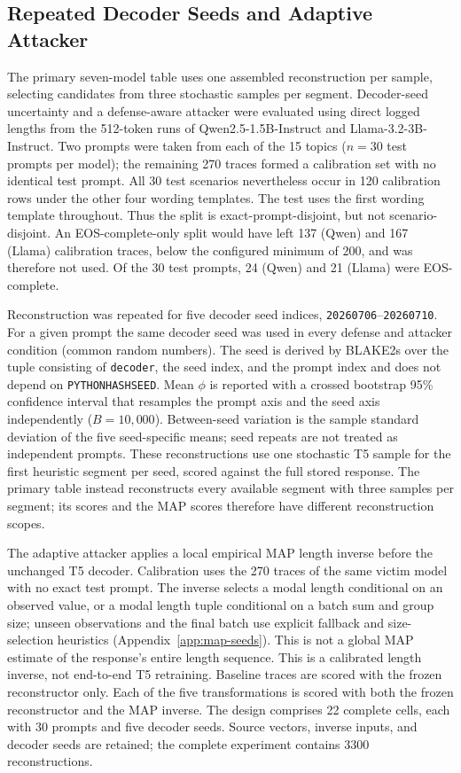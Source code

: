 \documentclass[electronics,article,submit,pdftex,moreauthors]{Definitions/mdpi}
\begin{document}
\subsection{Repeated Decoder Seeds and Adaptive Attacker}\label{sec:robustness-methods}
The primary seven-model table uses one assembled reconstruction per sample, selecting candidates from three stochastic samples per segment. Decoder-seed uncertainty and a defense-aware attacker were evaluated using direct logged lengths from the 512-token runs of Qwen2.5-1.5B-Instruct and Llama-3.2-3B-Instruct. Two prompts were taken from each of the 15 topics ($n=30$ test prompts per model); the remaining 270 traces formed a calibration set with no identical test prompt. All 30 test scenarios nevertheless occur in 120 calibration rows under the other four wording templates. The test uses the first wording template throughout. Thus the split is exact-prompt-disjoint, but not scenario-disjoint. An EOS-complete-only split would have left 137 (Qwen) and 167 (Llama) calibration traces, below the configured minimum of 200, and was therefore not used. Of the 30 test prompts, 24 (Qwen) and 21 (Llama) were EOS-complete.

Reconstruction was repeated for five decoder seed indices, \texttt{20260706}--\texttt{20260710}. For a given prompt the same decoder seed was used in every defense and attacker condition (common random numbers). The seed is derived by BLAKE2s over the tuple consisting of \texttt{decoder}, the seed index, and the prompt index and does not depend on \texttt{PYTHONHASHSEED}. Mean $\phi$ is reported with a crossed bootstrap 95\% confidence interval that resamples the prompt axis and the seed axis independently ($B=10{,}000$). Between-seed variation is the sample standard deviation of the five seed-specific means; seed repeats are not treated as independent prompts. These reconstructions use one stochastic T5 sample for the first heuristic segment per seed, scored against the full stored response. The primary table instead reconstructs every available segment with three samples per segment; its scores and the MAP scores therefore have different reconstruction scopes.

The adaptive attacker applies a local empirical MAP length inverse before the unchanged T5 decoder. Calibration uses the 270 traces of the same victim model with no exact test prompt. The inverse selects a modal length conditional on an observed value, or a modal length tuple conditional on a batch sum and group size; unseen observations and the final batch use explicit fallback and size-selection heuristics (Appendix~\ref{app:map-seeds}). This is not a global MAP estimate of the response's entire length sequence. This is a calibrated length inverse, not end-to-end T5 retraining. Baseline traces are scored with the frozen reconstructor only. Each of the five transformations is scored with both the frozen reconstructor and the MAP inverse. The design comprises 22 complete cells, each with 30 prompts and five decoder seeds. Source vectors, inverse inputs, and decoder seeds are retained; the complete experiment contains 3300 reconstructions.
\end{document}
